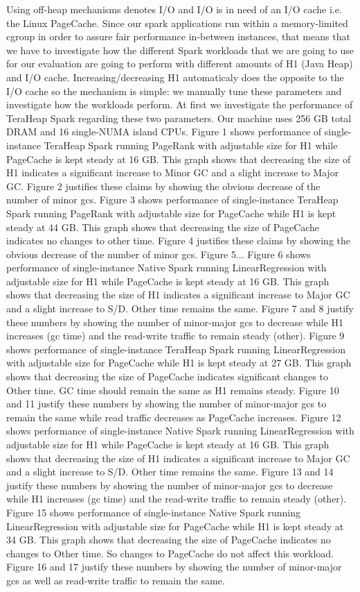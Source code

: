 \documentclass[twocolumn,10pt]{asme2e}
\begin{document}
Using off-heap mechanisms denotes I/O and I/O is in need of an I/O cache i.e. the Linux PageCache. Since our spark applications run within a memory-limited cgroup in order to assure fair performance in-between instances, that means that we have to investigate how the different Spark workloads that we are going to use for our evaluation are going to perform with different amounts of H1 (Java Heap) and I/O cache. Increasing/decreasing H1 automaticaly does the opposite to the I/O cache so the mechanism is simple: we manually tune these parameters and investigate how the workloads perform. At first we investigate the performance of TeraHeap Spark regarding these two parameters. Our machine uses 256 GB total DRAM and 16 single-NUMA island CPUs. Figure 1 shows performance of single-instance TeraHeap Spark running PageRank with adjustable size for H1 while PageCache is kept steady at 16 GB. This graph shows that decreasing the size of H1 indicates a significant increase to Minor GC and a slight increase to Major GC. Figure 2 justifies these claims by showing the obvious decrease of the number of minor gcs. Figure 3 shows performance of single-instance TeraHeap Spark running PageRank with adjustable size for PageCache while H1 is kept steady at 44 GB. This graph shows that decreasing the size of PageCache indicates no changes to other time. Figure 4 justifies these claims by showing the obvious decrease of the number of minor gcs. Figure 5... Figure 6 shows performance of single-instance Native Spark running LinearRegression with adjustable size for H1 while PageCache is kept steady at 16 GB. This graph shows that decreasing the size of H1 indicates a significant increase to Major GC and a slight increase to S/D. Other time remains the same. Figure 7 and 8 justify these numbers by showing the number of minor-major gcs to decrease while H1 increases (gc time) and the read-write traffic to remain steady (other). Figure 9 shows performance of single-instance TeraHeap Spark running LinearRegression with adjustable size for PageCache while H1 is kept steady at 27 GB. This graph shows that decreasing the size of PageCache indicates significant changes to Other time. GC time should remain the same as H1 remains steady. Figure 10 and 11 justify these numbers by showing the number of minor-major gcs to remain the same while read traffic decreases as PageCache increases. Figure 12 shows performance of single-instance Native Spark running LinearRegression with adjustable size for H1 while PageCache is kept steady at 16 GB. This graph shows that decreasing the size of H1 indicates a significant increase to Major GC and a slight increase to S/D. Other time remains the same. Figure 13 and 14 justify these numbers by showing the number of minor-major gcs to decrease while H1 increases (gc time) and the read-write traffic to remain steady (other). Figure 15 shows performance of single-instance Native Spark running LinearRegression with adjustable size for PageCache while H1 is kept steady at 34 GB. This graph shows that decreasing the size of PageCache indicates no changes to Other time. So changes to PageCache do not affect this workload. Figure 16 and 17 justify these numbers by showing the number of minor-major gcs as well as read-write traffic to remain the same.
\end{document}
